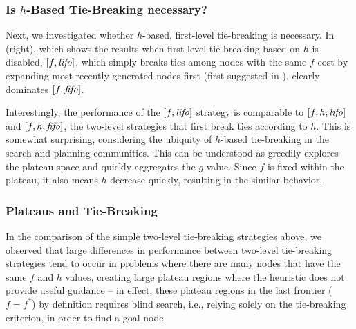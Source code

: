 \subsubsection{Is $h$-Based Tie-Breaking necessary?}

Next, we investigated whether $h$-based, first-level tie-breaking is necessary.
In  (right), which shows the results when  first-level
tie-breaking based on $h$ is disabled, $[f, \mbox{\textit{lifo}}]$, which simply breaks ties among nodes with the same $f$-cost by expanding most recently generated nodes first (first suggested in \cite{korf1985depth}),
clearly dominates $[f, \mbox{\textit{fifo}}]$.

Interestingly, the performance of the $[f, \mbox{\textit{lifo}}]$ strategy
is comparable to $[f,h,\mbox{\textit{lifo}}]$ and $[f,h,\mbox{\textit{fifo}}]$, the two-level strategies that first break ties according to $h$.
This is somewhat surprising, considering the ubiquity of $h$-based tie-breaking in the search and planning communities.
% 
This can be understood as \lifo greedily explores the plateau space
and quickly aggregates the $g$ value. Since $f$ is fixed within the
plateau, it also means $h$ decrease quickly, resulting in the similar behavior.



\subsubsection{Plateaus and Tie-Breaking}

In the comparison of the simple two-level tie-breaking strategies
above, we observed that large differences in performance between
two-level tie-breaking strategies tend to occur in problems where
there are many nodes that have the same $f$ and $h$ values, creating
large plateau regions where the heuristic does not provide
useful guidance -- in effect, these plateau regions in the last
frontier ($f=f^*$) by definition requires blind search, i.e., 
relying solely on the tie-breaking criterion, in order to
find a goal node.

